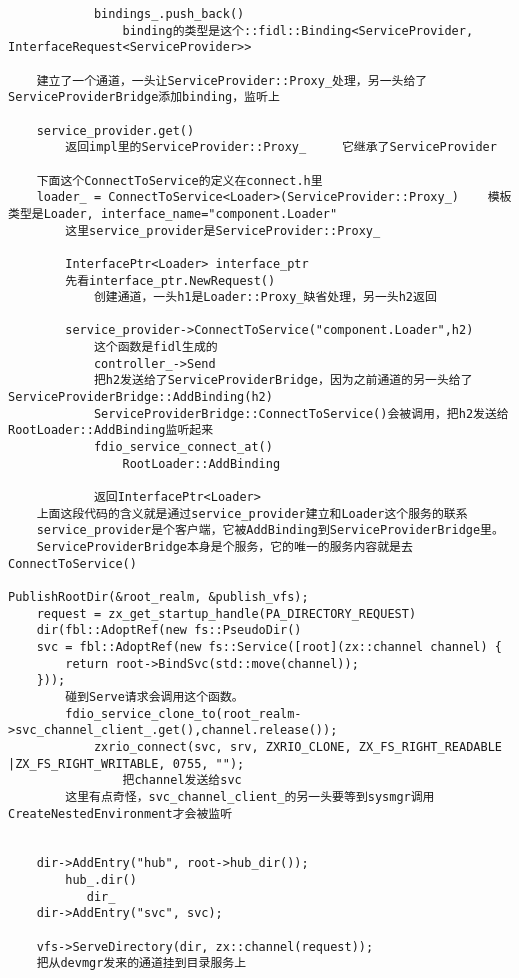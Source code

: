 \begin{verbatim}
            bindings_.push_back()
                binding的类型是这个::fidl::Binding<ServiceProvider, InterfaceRequest<ServiceProvider>>

    建立了一个通道，一头让ServiceProvider::Proxy_处理，另一头给了ServiceProviderBridge添加binding，监听上

    service_provider.get()
        返回impl里的ServiceProvider::Proxy_     它继承了ServiceProvider
        
    下面这个ConnectToService的定义在connect.h里
    loader_ = ConnectToService<Loader>(ServiceProvider::Proxy_)    模板类型是Loader, interface_name="component.Loader"
        这里service_provider是ServiceProvider::Proxy_

        InterfacePtr<Loader> interface_ptr
        先看interface_ptr.NewRequest()
            创建通道，一头h1是Loader::Proxy_缺省处理，另一头h2返回

        service_provider->ConnectToService("component.Loader",h2)
            这个函数是fidl生成的
            controller_->Send
            把h2发送给了ServiceProviderBridge，因为之前通道的另一头给了ServiceProviderBridge::AddBinding(h2)
            ServiceProviderBridge::ConnectToService()会被调用，把h2发送给RootLoader::AddBinding监听起来
            fdio_service_connect_at()
                RootLoader::AddBinding

            返回InterfacePtr<Loader>
    上面这段代码的含义就是通过service_provider建立和Loader这个服务的联系
    service_provider是个客户端，它被AddBinding到ServiceProviderBridge里。
    ServiceProviderBridge本身是个服务，它的唯一的服务内容就是去ConnectToService()

PublishRootDir(&root_realm, &publish_vfs);
    request = zx_get_startup_handle(PA_DIRECTORY_REQUEST)
    dir(fbl::AdoptRef(new fs::PseudoDir()
    svc = fbl::AdoptRef(new fs::Service([root](zx::channel channel) {
        return root->BindSvc(std::move(channel));
    }));
        碰到Serve请求会调用这个函数。
        fdio_service_clone_to(root_realm->svc_channel_client_.get(),channel.release());
            zxrio_connect(svc, srv, ZXRIO_CLONE, ZX_FS_RIGHT_READABLE |ZX_FS_RIGHT_WRITABLE, 0755, "");
                把channel发送给svc
        这里有点奇怪，svc_channel_client_的另一头要等到sysmgr调用CreateNestedEnvironment才会被监听


    dir->AddEntry("hub", root->hub_dir());
        hub_.dir()
           dir_
    dir->AddEntry("svc", svc);

    vfs->ServeDirectory(dir, zx::channel(request));
    把从devmgr发来的通道挂到目录服务上


\end{verbatim}

